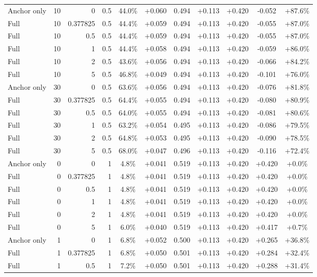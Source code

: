 \begin{table}[htbp]
\begin{tabular}{lrrrccccccc}
Anchor only & 10 & 0 & 0.5 & 44.0\% & +0.060 & 0.494 & +0.113 & +0.420 & -0.052 & +87.6\% \\
Full & 10 & 0.377825 & 0.5 & 44.4\% & +0.059 & 0.494 & +0.113 & +0.420 & -0.055 & +87.0\% \\
Full & 10 & 0.5 & 0.5 & 44.4\% & +0.059 & 0.494 & +0.113 & +0.420 & -0.055 & +87.0\% \\
Full & 10 & 1 & 0.5 & 44.4\% & +0.058 & 0.494 & +0.113 & +0.420 & -0.059 & +86.0\% \\
Full & 10 & 2 & 0.5 & 43.6\% & +0.056 & 0.494 & +0.113 & +0.420 & -0.066 & +84.2\% \\
Full & 10 & 5 & 0.5 & 46.8\% & +0.049 & 0.494 & +0.113 & +0.420 & -0.101 & +76.0\% \\
Anchor only & 30 & 0 & 0.5 & 63.6\% & +0.056 & 0.494 & +0.113 & +0.420 & -0.076 & +81.8\% \\
Full & 30 & 0.377825 & 0.5 & 64.4\% & +0.055 & 0.494 & +0.113 & +0.420 & -0.080 & +80.9\% \\
Full & 30 & 0.5 & 0.5 & 64.0\% & +0.055 & 0.494 & +0.113 & +0.420 & -0.081 & +80.6\% \\
Full & 30 & 1 & 0.5 & 63.2\% & +0.054 & 0.495 & +0.113 & +0.420 & -0.086 & +79.5\% \\
Full & 30 & 2 & 0.5 & 64.8\% & +0.053 & 0.495 & +0.113 & +0.420 & -0.090 & +78.5\% \\
Full & 30 & 5 & 0.5 & 68.0\% & +0.047 & 0.496 & +0.113 & +0.420 & -0.116 & +72.4\% \\
Anchor only & 0 & 0 & 1 & 4.8\% & +0.041 & 0.519 & +0.113 & +0.420 & +0.420 & +0.0\% \\
Full & 0 & 0.377825 & 1 & 4.8\% & +0.041 & 0.519 & +0.113 & +0.420 & +0.420 & +0.0\% \\
Full & 0 & 0.5 & 1 & 4.8\% & +0.041 & 0.519 & +0.113 & +0.420 & +0.420 & +0.0\% \\
Full & 0 & 1 & 1 & 4.8\% & +0.041 & 0.519 & +0.113 & +0.420 & +0.420 & +0.0\% \\
Full & 0 & 2 & 1 & 4.8\% & +0.041 & 0.519 & +0.113 & +0.420 & +0.420 & +0.0\% \\
Full & 0 & 5 & 1 & 6.0\% & +0.040 & 0.519 & +0.113 & +0.420 & +0.417 & +0.7\% \\
Anchor only & 1 & 0 & 1 & 6.8\% & +0.052 & 0.500 & +0.113 & +0.420 & +0.265 & +36.8\% \\
Full & 1 & 0.377825 & 1 & 6.8\% & +0.050 & 0.501 & +0.113 & +0.420 & +0.284 & +32.4\% \\
Full & 1 & 0.5 & 1 & 7.2\% & +0.050 & 0.501 & +0.113 & +0.420 & +0.288 & +31.4\% \\

\end{tabular}
\end{table}
